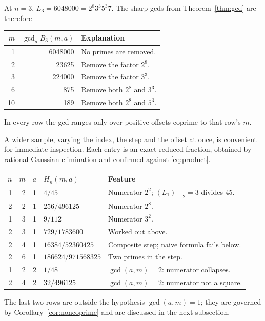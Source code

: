 \documentclass[11pt,a4paper]{article}
\numberwithin{equation}{section}
\theoremstyle{definition}
\theoremstyle{remark}
\begin{document}
At $n=3$, $L_3=6048000=2^8 3^3 5^3 7$. The sharp gcds from Theorem~\ref{thm:gcd} are therefore
\begin{center}
\begin{tabular}{r r l}
\toprule
$m$ & $\gcd_a B_3(m,a)$ & Explanation\\
\midrule
1 & 6048000 & No primes are removed.\\
2 & 23625 & Remove the factor $2^8$.\\
3 & 224000 & Remove the factor $3^3$.\\
6 & 875 & Remove both $2^8$ and $3^3$.\\
10 & 189 & Remove both $2^8$ and $5^3$.\\
\bottomrule
\end{tabular}
\end{center}
In every row the gcd ranges only over positive offsets coprime to that row's $m$.

A wider sample, varying the index, the step and the offset at once, is convenient for immediate inspection. Each entry is an exact reduced fraction, obtained by rational Gaussian elimination and confirmed against \eqref{eq:product}.
\begin{center}
\begin{tabular}{r r r l l}
\toprule
$n$ & $m$ & $a$ & $H_n(m,a)$ & Feature\\
\midrule
1 & 2 & 1 & $4/45$ & Numerator $2^2$; $(L_1)_{\perp2}=3$ divides $45$.\\
2 & 2 & 1 & $256/496125$ & Numerator $2^8$.\\
1 & 3 & 1 & $9/112$ & Numerator $3^2$.\\
2 & 3 & 1 & $729/1783600$ & Worked out above.\\
2 & 4 & 1 & $16384/52360425$ & Composite step; naive formula fails below.\\
2 & 6 & 1 & $186624/971568325$ & Two primes in the step.\\
1 & 2 & 2 & $1/48$ & $\gcd(a,m)=2$: numerator collapses.\\
2 & 4 & 2 & $32/496125$ & $\gcd(a,m)=2$: numerator not a square.\\
\bottomrule
\end{tabular}
\end{center}
The last two rows are outside the hypothesis $\gcd(a,m)=1$; they are governed by Corollary~\ref{cor:noncoprime} and are discussed in the next subsection.
\end{document}
